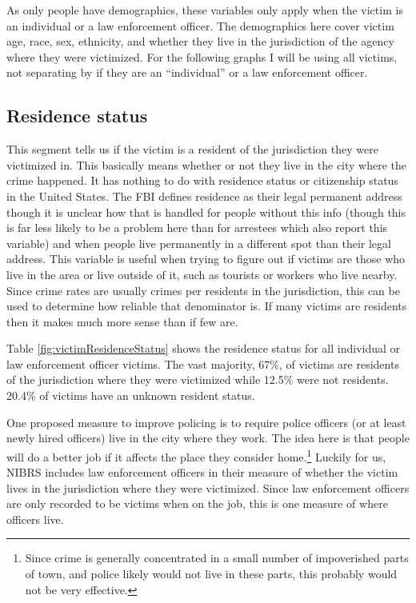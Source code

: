 \documentclass[
]{krantz}
\begin{document}
As only people have demographics, these variables only apply
when the victim is an individual or a law enforcement
officer. The demographics here cover victim age, race, sex,
ethnicity, and whether they live in the jurisdiction of the
agency where they were victimized. For the following graphs
I will be using all victims, not separating by if they are
an ``individual'' or a law enforcement officer.

\subsection{Residence status}\label{residence-status}

This segment tells us if the victim is a resident of the
jurisdiction they were victimized in. This basically means
whether or not they live in the city where the crime
happened. It has nothing to do with residence status or
citizenship status in the United States. The FBI defines
residence as their legal permanent address though it is
unclear how that is handled for people without this info
(though this is far less likely to be a problem here than
for arrestees which also report this variable) and when
people live permanently in a different spot than their legal
address. This variable is useful when trying to figure out
if victims are those who live in the area or live outside of
it, such as tourists or workers who live nearby. Since crime
rates are usually crimes per residents in the jurisdiction,
this can be used to determine how reliable that denominator
is. If many victims are residents then it makes much more
sense than if few are.

Table \ref{fig:victimResidenceStatus} shows the residence
status for all individual or law enforcement officer
victims. The vast majority, 67\%, of victims are residents
of the jurisdiction where they were victimized while 12.5\%
were not residents. 20.4\% of victims have an unknown
resident status.

One proposed measure to improve policing is to require
police officers (or at least newly hired officers) live in
the city where they work. The idea here is that people will
do a better job if it affects the place they consider
home.\footnote{Since crime is generally concentrated in a
  small number of impoverished parts of town, and police
  likely would not live in these parts, this probably would
  not be very effective.} Luckily for us, NIBRS includes law
enforcement officers in their measure of whether the victim
lives in the jurisdiction where they were victimized. Since
law enforcement officers are only recorded to be victims
when on the job, this is one measure of where officers live.
\end{document}

